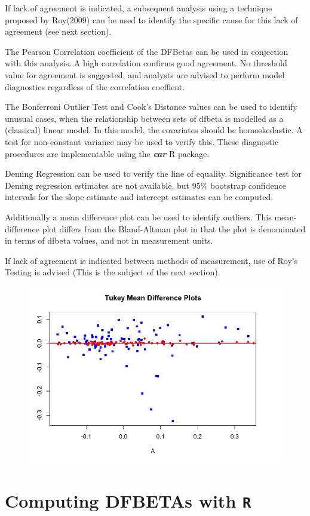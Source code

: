 \documentclass[12pt, a4paper]{report}
\theoremstyle{plain}
\theoremstyle{definition}
\theoremstyle{remark}
\begin{document}
If lack of agreement is indicated, a subsequent analysis using a technique proposed by Roy(2009) can be used to identify the specific cause for this lack of agreement (see next section).
\newpage

The Pearson Correlation coefficient of the DFBetas can be used in conjection with this analysis. A high correlation confirms good agreement. No threshold value for agreement is suggested, and analysts are advised to perform model diagnostics regardless of the correlation coeffient. 


The Bonferroni Outlier Test and Cook's Distance values can be used to identify unusual cases, when the relationship between sets of dfbeta is modelled as a (classical) linear model. In this model, the covariates should be homoskedastic. A test for non-constant variance may be used to verify this. These diagnostic procedures are implementable using the \textbf{\textit{car}} R package.


Deming Regression can be used to verify the line of equality. Significance test for Deming regression estimates are not available, but 95\% bootstrap confidence intervals for the slope estimate and intercept estimates can be computed. 


Additionally a mean difference plot can be used to identify outliers. This mean-difference plot differs from the Bland-Altman plot in that the plot is denominated in terms of dfbeta values, and not in measurement units.

If lack of agreement is indicated between methods of measurement, use of Roy's Testing is advised (This is the subject of the next section).
\begin{figure}[h1]
	\centering
	\includegraphics[width=0.7\linewidth]{images/04-TMDplot}
	
\end{figure}
\newpage
\section{Computing DFBETAs with \texttt{R}}
\end{document}
